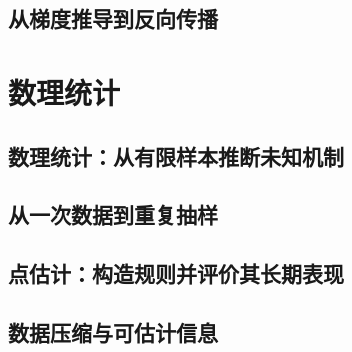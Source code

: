 \documentclass[UTF8,openany]{ctexbook}
\theoremstyle{definition}
\theoremstyle{plain}
\begin{document}
\chapter*{从梯度推导到反向传播}
\label{ch:084}




\clearpage
\part{数理统计}
\chapter*{数理统计：从有限样本推断未知机制}
\label{ch:085}

\clearpage
\chapter*{从一次数据到重复抽样}
\label{ch:086}




\clearpage
\chapter*{点估计：构造规则并评价其长期表现}
\label{ch:087}





\clearpage
\chapter*{数据压缩与可估计信息}
\label{ch:088}




\clearpage
\end{document}
